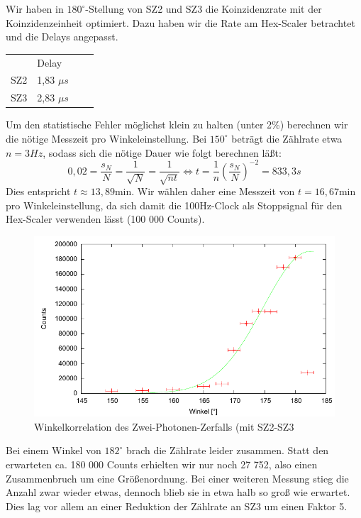 Wir haben in $180^\circ$-Stellung von SZ2 und SZ3 die Koinzidenzrate mit der Koinzidenzeinheit optimiert. Dazu haben wir die Rate am Hex-Scaler betrachtet und die Delays angepasst.

\begin{center}
\begin{tabular}{llll}
 & Delay\\
SZ2 & 1,83 $\mu s$\\
SZ3 & 2,83 $\mu s$
\end{tabular}
\end{center}

Um den statistische Fehler möglichst klein zu halten (unter 2\%) berechnen wir die nötige Messzeit pro Winkeleinstellung. Bei $150^\circ$ beträgt die Zählrate etwa $n = 3 Hz$, sodass sich die nötige Dauer wie folgt berechnen läßt:
\begin{equation}
 0,02 = \frac{s_N}{N} = \frac{1}{\sqrt{N}} = \frac{1}{\sqrt{n t}} \Leftrightarrow t = \frac{1}{n}\left( \frac{s_N}{N} \right)^{-2} = 833,3s
\end{equation}
Dies entspricht $t \approx 13,89 \text{min}$. Wir wählen daher eine Messzeit von $t = 16,67 \text{min}$ pro Winkeleinstellung, da sich damit die 100Hz-Clock als Stoppsignal für den Hex-Scaler verwenden lässt (100 000 Counts). 

\begin{figure}[H]
 \includegraphics[width=\textwidth]{Graphen/2er/erste.pdf}
 \caption{Winkelkorrelation des Zwei-Photonen-Zerfalls (mit SZ2-SZ3}
\end{figure}

Bei einem Winkel von $182^\circ$ brach die Zählrate leider zusammen. Statt den erwarteten ca. 180 000 Counts erhielten wir nur noch 27 752, also einen Zusammenbruch um eine Größenordnung. Bei einer weiteren Messung stieg die Anzahl zwar wieder etwas, dennoch blieb sie in etwa halb so groß wie erwartet. Dies lag vor allem an einer Reduktion der Zählrate an SZ3 um einen Faktor 5.  

